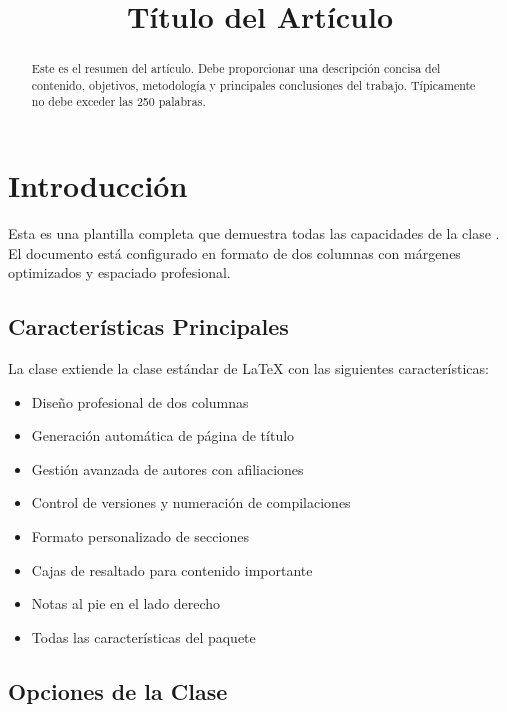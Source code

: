 \documentclass{pt-article}
\title{Título del Artículo}
\begin{document}

\begin{abstract}
Este es el resumen del artículo. Debe proporcionar una descripción concisa
del contenido, objetivos, metodología y principales conclusiones del trabajo.
Típicamente no debe exceder las 250 palabras.
\end{abstract}


\section{Introducción}

Esta es una plantilla completa que demuestra todas las capacidades de la clase
. El documento está configurado en formato de dos columnas
con márgenes optimizados y espaciado profesional.

\subsection{Características Principales}

La clase  extiende la clase estándar 
de \LaTeX{} con las siguientes características:

\begin{itemize}
    \item Diseño profesional de dos columnas
    \item Generación automática de página de título
    \item Gestión avanzada de autores con afiliaciones
    \item Control de versiones y numeración de compilaciones
    \item Formato personalizado de secciones
    \item Cajas de resaltado para contenido importante
    \item Notas al pie en el lado derecho
    \item Todas las características del paquete 
\end{itemize}

\subsection{Opciones de la Clase}
\end{document}
